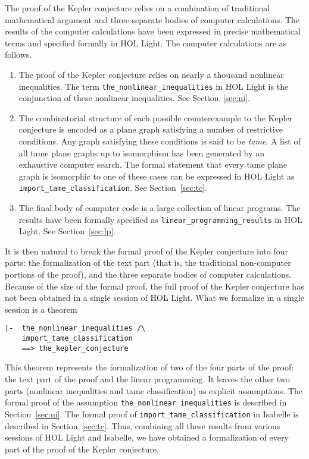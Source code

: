 The proof of the Kepler conjecture relies on a combination of
traditional mathematical argument and three separate bodies of
computer calculations.  The results of the computer calculations have
been expressed in precise mathematical terms and specified formally in
HOL Light.  The computer calculations are as follows.
\begin{enumerate}
\item The proof of the Kepler conjecture relies on nearly a thousand
  nonlinear inequalities.  
  The term \verb!the_nonlinear_inequalities! in HOL Light is the
  conjunction of these nonlinear inequalities.  See
  Section~\ref{sec:ni}.
\item The combinatorial structure of each possible counterexample to
  the Kepler conjecture is encoded as a plane graph satisfying a
  number of restrictive conditions.  Any graph satisfying these
  conditions is said to be {\it tame}.  A list of all tame plane graphs up
  to isomorphism has been generated by an exhaustive computer search.
  The formal statement that every tame plane graph is isomorphic to one of
  these cases can be expressed in HOL Light as
  \verb!import_tame_classification!.  See Section~\ref{sec:tc}.
\item The final body of computer code is a large collection of linear
  programs.  The results have been formally specified as
  \verb!linear_programming_results! in HOL Light.  See Section~\ref{sec:lp}.
\end{enumerate}

It is then natural to break the formal proof of the Kepler conjecture
into four parts: the formalization of the text part (that is, the
traditional non-computer portions of the proof), and the three
separate bodies of computer calculations.  Because of the size of the
formal proof, the full proof of the Kepler conjecture has not been
obtained in a single session of HOL Light.  What we formalize in a
single session is a theorem

\begin{obeylines}

\begin{verbatim}
|-  the_nonlinear_inequalities /\
    import_tame_classification
    ==> the_kepler_conjecture
\end{verbatim}

\end{obeylines}

This theorem represents the formalization of two of the four parts of
the proof: the text part of the proof and the linear programming.  It
leaves the other two parts (nonlinear inequalities and tame
classification) as explicit assumptions.  The formal proof of the assumption
\verb!the_nonlinear_inequalities! is described in
Section~\ref{sec:ni}.  The formal proof of
\verb!import_tame_classification! in Isabelle is described in
Section~\ref{sec:tc}.  Thus, combining all these results from various
sessions of HOL Light and Isabelle, we have obtained a formalization
of every part of the proof of the Kepler conjecture.


